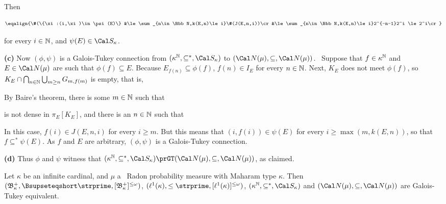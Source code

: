 {

\noindent Then

$$\eqalign{\#(\{\xi:(i,\xi)\in\psi(E)\}
&\le\sum_{n\in\Bbb N,k(E,n)\le i}\#(J(E,n,i))\cr
&\le\sum_{n\in\Bbb N,k(E,n)\le i}2^{-n-1}2^i
\le 2^i\cr}$$

\noindent for every $i\in\Bbb N$, and $\psi(E)\in\Cal S_{\kappa}$.

\medskip

{\bf (c)} Now $(\phi,\psi)$ is a Galois-Tukey connection from
$(\kappa^{\Bbb N},\subseteq^*,\Cal S_{\kappa})$ to
$(\Cal N(\mu),\subseteq,\Cal N(\mu))$.   \Prf\ Suppose that
$f\in\kappa^{\Bbb N}$ and $E\in\Cal N(\mu)$ are such that
$\phi(f)\subseteq E$.   Because $E_{f(n)}\subseteq\phi(f)$,
$f(n)\in I_E$ for every $n\in\Bbb N$.   Next, $K_E$ does not meet
$\phi(f)$, so $K_E\cap\bigcap_{n\in\Bbb N}\bigcup_{m\ge n}G_{m,f(m)}$ is
empty, that is,


\noindent By Baire's theorem, there is some $m\in\Bbb N$ such that


\noindent is not dense in $\pi_E[K_E]$, and there is an $n\in\Bbb N$
such that


\noindent In this case, $f(i)\in J(E,n,i)$ for every $i\ge m$.   But
this means that $(i,f(i))\in\psi(E)$ for every $i\ge\max(m,k(E,n))$, so
that $f\subseteq^*\psi(E)$.   As $f$ and $E$ are arbitrary,
$(\phi,\psi)$ is a Galois-Tukey connection.\ \Qed

\medskip

{\bf (d)} Thus $\phi$ and $\psi$ witness that
$(\kappa^{\Bbb N},\subseteq^*,\Cal S_{\kappa})
\prGT(\Cal N(\mu),\subseteq,\Cal N(\mu))$, as claimed.
}%

 Let $\kappa$ be an infinite cardinal, and $\mu$
a \Mth\ Radon probability measure with Maharam type $\kappa$.
Then $(\frak B_{\kappa}^+,\Bsupseteqshort\strprime,
  [\frak B_{\kappa}^+]^{\le\omega})$,
$(\ell^1(\kappa),
  \le\strprime,\penalty-100[\ell^1(\kappa)]^{\le\omega})$,
$(\kappa^{\Bbb N},\subseteq^*,\Cal S_{\kappa})$
and $(\Cal N(\mu),\subseteq\nobreak,\Cal N(\mu))$ are
Galois-Tukey equivalent.

